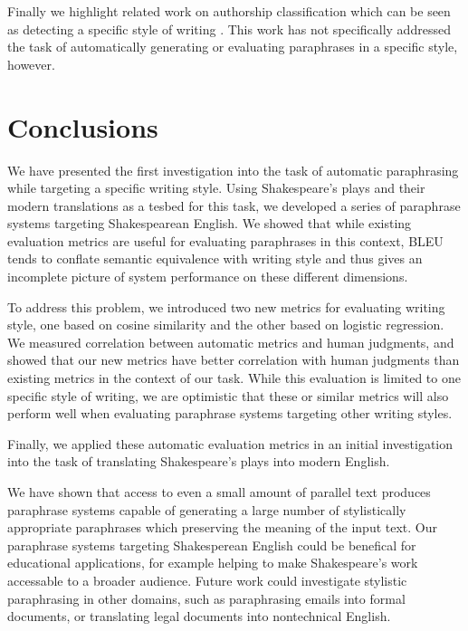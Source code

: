 \documentclass[10pt,a5paper,twoside]{article}
\begin{document}
Finally we highlight related work on authorship classification which can be seen as detecting a specific style of writing \cite{Gamon04,Raghavan10}.
This work has not specifically addressed the task of automatically generating or evaluating paraphrases in a specific style, however.

\section{Conclusions}
We have presented the first investigation into the task of automatic paraphrasing while targeting a specific writing style.  Using Shakespeare's plays and their
modern translations as a tesbed for this task, we developed a series of paraphrase systems targeting Shakespearean English.  We showed that while existing evaluation
metrics are useful for evaluating paraphrases in this context, BLEU tends to conflate semantic equivalence with writing style and thus gives an incomplete picture of 
system performance on these different dimensions.

To address this problem, we introduced two new metrics for evaluating writing style, one based on cosine similarity and the other based on logistic regression.
We measured correlation between automatic metrics and human judgments, and showed
that our new metrics have better correlation with human judgments than existing metrics in the context of our task.
While this evaluation is limited to one specific style of writing, we are optimistic that these or similar metrics will also perform well when
evaluating paraphrase systems targeting other writing styles.

Finally, we applied these automatic evaluation metrics in an initial investigation into the task of translating Shakespeare's plays into modern English.

We have shown that access to even a small amount of parallel text produces paraphrase systems 
capable of generating a large number of stylistically appropriate paraphrases which preserving the meaning of the input text.  
Our paraphrase systems targeting Shakesperean English could be benefical for educational applications, for example helping to
make Shakespeare's work accessable to a broader audience.
Future work could investigate stylistic paraphrasing in other domains, such as paraphrasing emails into formal documents, or
translating legal documents into nontechnical English. 




\end{document}
